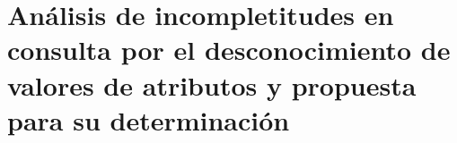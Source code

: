 \chapter{Análisis de incompletitudes en consulta por el desconocimiento de valores de atributos y propuesta para su determinación} \label{chap:analisisOrigenIncompletitud}

